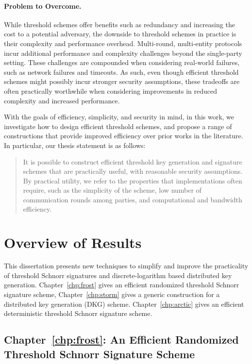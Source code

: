 \paragraph{Problem to Overcome.}
While threshold schemes offer benefits such as redundancy and increasing the
cost to a potential adversary,
the downside to threshold schemes in practice is their complexity and
performance overhead.
Multi-round, multi-entity protocols incur additional performance and complexity challenges beyond the single-party setting.
These challenges are compounded when considering real-world failures,
such as network failures and timeouts.
As such, even though efficient threshold schemes might possibly incur stronger security assumptions,
these tradeoffs are often practically worthwhile when considering improvements in reduced complexity and increased performance.

With the goals of efficiency, simplicity, and security in mind,
in this work,
we investigate how to design efficient threshold schemes,
and propose a range of constructions that provide improved efficiency over
prior works in the literature.
In particular,
our thesis statement is as follows:


\begin{quote}
  \it
  \begin{sloppypar}
It is possible to construct efficient threshold key generation
and signature schemes that are practically useful,
with reasonable security assumptions.
By practical utility,
we refer to the properties that implementations often require,
such as the simplicity of the scheme,
low number of communication rounds among parties,
and computational and bandwidth efficiency.
  \end{sloppypar}
\end{quote}

\section{Overview of Results}

This dissertation presents new techniques to simplify and improve the practicality of threshold Schnorr signatures and discrete-logarithm based distributed key generation.
Chapter~\ref{chp:frost} gives an efficient randomized threshold Schnorr signature scheme,
Chapter~\ref{chp:storm} gives a generic construction for a distributed key generation (DKG) scheme.
Chapter~\ref{chp:arctic} gives an efficient deterministic threshold Schnorr signature scheme.

\subsection{Chapter~\ref{chp:frost}: An Efficient Randomized Threshold Schnorr Signature Scheme}

